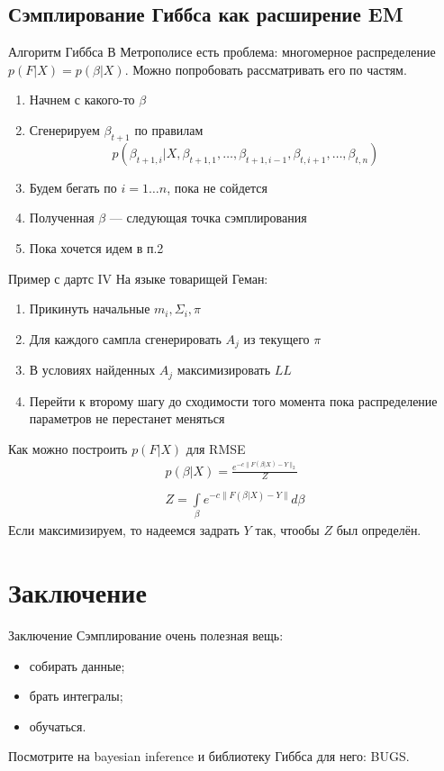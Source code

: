\documentclass[14pt, fleqn, xcolor={dvipsnames, table}]{beamer}
\begin{document}
\subsection{Сэмплирование Гиббса как расширение EM}
\begin{frame}{Алгоритм Гиббса}
В Метрополисе есть проблема: многомерное распределение $p(F|X) = p(\beta|X)$. Можно попробовать рассматривать его по частям.
\begin{enumerate}
  \item Начнем с какого-то $\beta$
  \item Сгенерируем $\beta_{t+1}$ по правилам
$$
p(\beta_{t + 1,i} | X, \beta_{t+1,1},\ldots,\beta_{t+1, i-1}, \beta_{t, i+1},\ldots, \beta_{t,n})
$$
  \item Будем бегать по $i=1\ldots n$, пока не сойдется
  \item Полученная $\beta$ --- следующая точка сэмплирования
  \item Пока хочется идем в п.2
\end{enumerate}
\end{frame}

\begin{frame}{Пример с дартс IV}
\small
На языке товарищей Геман:
\begin{enumerate}
  \item Прикинуть начальные $m_i, \Sigma_i, \pi$
  \item Для каждого сампла сгенерировать $A_j$ из текущего $\pi$
  \item В условиях найденных $A_j$ максимизировать $LL$
  \item Перейти к второму шагу до сходимости того момента пока распределение параметров не перестанет меняться
\end{enumerate}
\end{frame}

\begin{frame}{Как можно построить $p(F|X)$ для RMSE}
$$\begin{array}{l}
p(\beta|X) = \frac{e^{-c\|F(\beta|X) - Y\|_2}}{Z} \\
\\
Z = \int\limits_{\beta} e^{-c\|F(\beta|X) - Y\|}d\beta
\end{array}$$
Если максимизируем, то надеемся задрать $Y$ так, чтообы $Z$ был определён. 
\end{frame}

\section{Заключение}
\begin{frame}{Заключение}
Сэмплирование очень полезная вещь:
\begin{itemize}
  \item собирать данные;
  \item брать интегралы;
  \item обучаться.
\end{itemize}
Посмотрите на bayesian inference и библиотеку Гиббса для него: BUGS.
\end{frame}
\end{document}
